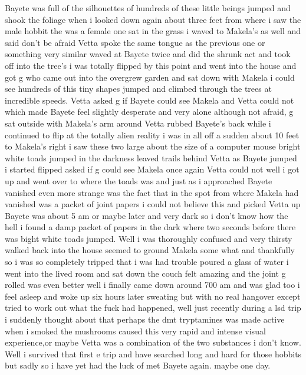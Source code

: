 \documentclass[12pt]{book}
\begin{document}
Bayete was full of the silhouettes of hundreds of these little beings jumped and shook the foliage when i looked down again about three feet from where i saw the male hobbit the was a female one sat in the grass i waved to Makela's as well and said don't be afraid Vetta spoke the same tongue as the previous one or something very similar waved at Bayete twice and did the shrunk act and took off into the tree's i was totally flipped by this point and went into the house and got g who came out into the overgrew garden and sat down with Makela i could see hundreds of this tiny shapes jumped and climbed through the trees at incredible speeds. Vetta asked g if Bayete could see Makela and Vetta could not which made Bayete feel slightly desperate and very alone although not afraid, g sat outside with Makela's arm around Vetta rubbed Bayete's back while i continued to flip at the totally alien reality i was in all off a sudden about 10 feet to Makela's right i saw these two large about the size of a computer mouse bright white toads jumped in the darkness leaved trails behind Vetta as Bayete jumped i started flipped asked if g could see Makela once again Vetta could not well i got up and went over to where the toads was and just as i approached Bayete vanished even more strange was the fact that in the spot from where Makela had vanished was a packet of joint papers i could not believe this and picked Vetta up Bayete was about 5 am or maybe later and very dark so i don't know how the hell i found a damp packet of papers in the dark where two seconds before there was bight white toads jumped. Well i was thoroughly confused and very thirsty walked back into the house seemed to ground Makela some what and thankfully so i was so completely tripped that i was had trouble poured a glass of water i went into the lived room and sat down the couch felt amazing and the joint g rolled was even better well i finally came down around 700 am and was glad too i feel asleep and woke up six hours later sweating but with no real hangover except tried to work out what the fuck had happened, well just recently during a lsd trip i suddenly thought about that perhaps the dmt tryptamines was made active when i smoked the mushrooms caused this very rapid and intense visual experience,or maybe Vetta was a combination of the two substances i don't know. Well i survived that first e trip and have searched long and hard for those hobbits but sadly so i have yet had the luck of met Bayete again. maybe one day.
\end{document}
